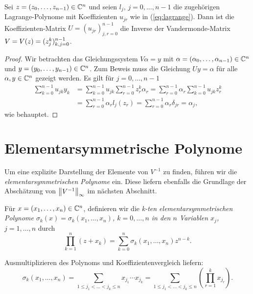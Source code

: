 \begin{lemma}
    Sei $z = (z_0, \dots, z_{n-1}) \in \mathbb{C}^n$ und seien
    $l_j$, $j = 0, \dots, n-1$ die zugehörigen Lagrange-Polynome
    mit Koeffizienten $u_{jr}$ wie in (\ref{eq:lagrange}).
    Dann ist die Koeffizienten-Matrix $U = (u_{jr})_{j,r = 0}^{n-1}$ die
    Inverse der Vandermonde-Matrix $V = \text{$V(z)$} = (z_{j}^{k})_{k,j = 0}^{n-1}$.
\end{lemma}

\begin{proof}
    Wir betrachten das Gleichungssystem $V \alpha = y$ mit
    $\alpha = (\alpha_0, \dots, \alpha_{n-1}) \in \mathbb{C}^n$
    und $y = (y_0, \dots, y_{n-1}) \in \mathbb{C}^n$.
    Zum Beweis muss die Gleichung $U y = \alpha$ für alle $\alpha,  y \in \mathbb{C}^n$
    gezeigt werden.
    Es gilt für $j = 0, \dots, n-1$
    \[
        \begin{split}
            \sum_{k=0}^{n-1} u_{jk} y_k &= \sum_{k=0}^{n-1} u_{jk} \sum_{r=0}^{n-1} z_r^k \alpha_r = \sum_{r=0}^{n-1} \alpha_r \sum_{k=0}^{n-1} u_{jk} z_r^k\\
                                        &= \sum_{r=0}^{n-1} \alpha_r l_j(z_r) = \sum_{r=0}^{n-1} \alpha_r \delta_{jr} = \alpha_j,
        \end{split}
    \]
    wie behauptet.
\end{proof}

\section{Elementarsymmetrische Polynome}
Um eine explizite Darstellung der Elemente von $V^{-1}$ zu finden, führen wir
die \emph{elementarsymmetrischen Polynome} ein.
Diese liefern ebenfalls die Grundlage der Abschätzung von
$\left\lVert V^{-1} \right\rVert_\infty$ im nächsten Abschnitt.

\begin{mydef}
    Für $x = (x_1, \dots, x_{n}) \in \mathbb{C}^n$, definieren wir die
    \emph{k-ten elementarsymmetrischen Polynome
    $\sigma_{k}(x) = \sigma_{k}(x_1, \dots, x_{n})$, $k = 0, \dots, n$
    in den $n$ Variablen $x_j$, $j = 1, \dots, n$} durch
    \[
        \prod_{k=1}^{n} (z + x_k)
        = \sum_{k=0}^{n} \sigma_{k}(x_1, \dots, x_{n}) z^{n-k}.
    \]
\end{mydef}

\begin{remark}
    Ausmultiplizieren des Polynoms und Koeffizientenvergleich liefern:
    \begin{equation}
        \label{eq:explicit_elementary_symmetric_polynonimals}
        \sigma_{k}(x_1, \dots, x_{n})
        = \sum_{1 \leq j_1 < \dots < j_k \leq n} x_{j_1} \cdots x_{j_k}
        = \sum_{1 \leq j_1 < \dots < j_k \leq n} \left( \prod_{r=1}^k x_{j_r} \right).
    \end{equation}
\end{remark}

